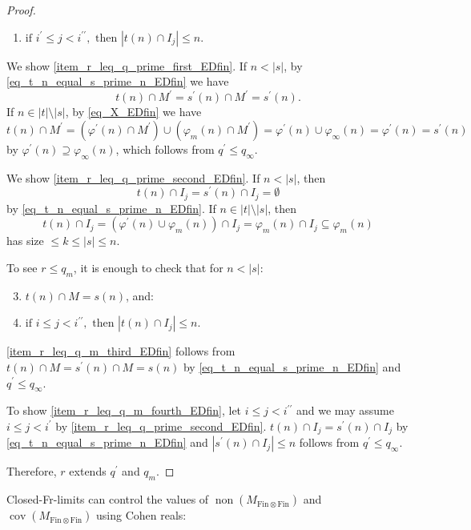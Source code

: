 \documentclass[a4paper,12pt]{amsart}
\theoremstyle{definition}
\numberwithin{thm}{section}
\numberwithin{equation}{section}
\DeclareMathOperator{\non}{non}
\DeclareMathOperator{\cov}{cov}
\newcommand{\finfin}{\mathrm{Fin}\otimes\mathrm{Fin}}
\begin{document}
\begin{proof}
\begin{enumerate}
			\item\label{item_r_leq_q_prime_second_EDfin}  $\text{if }i^\prime\leq j< i^{\prime\prime},\text{ then } |t(n)\cap I_j|\leq n$.
		\end{enumerate}
		We show \eqref{item_r_leq_q_prime_first_EDfin}.
		If $n<|s|$, by \eqref{eq_t_n_equal_s_prime_n_EDfin} we have
        \[
        t(n)\cap M^\prime=s^\prime(n)\cap M^\prime=s^\prime(n).
        \]
        If $n\in|t|\setminus|s|$, by \eqref{eq_X_EDfin} we have
        \[
        t(n)\cap M^\prime=(\varphi^\prime(n)\cap M^\prime)\cup(\varphi_m(n)\cap M^\prime)=\varphi^\prime(n)\cup\varphi_\infty(n)=\varphi^\prime(n)=s^\prime(n)
        \]
        by $\varphi^\prime(n)\supseteq\varphi_\infty(n)$, which follows from $q^\prime\leq q_\infty$.
		
		We show \eqref{item_r_leq_q_prime_second_EDfin}. 
		If $n<|s|$, then
        \[
        t(n)\cap I_j=s^\prime(n)\cap I_j=\emptyset
        \]
        by \eqref{eq_t_n_equal_s_prime_n_EDfin}.
		If $n\in|t|\setminus |s|$, then 
		\[
        t(n)\cap I_j=(\varphi^\prime(n)\cup\varphi_m(n))\cap I_j=\varphi_m(n)\cap I_j\subseteq \varphi_m(n)
        \]
        has size $\leq k\leq|s|\leq n$. 
		
		To see $r\leq q_m$, it is enough to check that for $n<|s|$:
		\begin{enumerate}
			\setcounter{enumi}{2}
			\item \label{item_r_leq_q_m_third_EDfin} $t(n)\cap M=s(n)$, and:
			\item \label{item_r_leq_q_m_fourth_EDfin} $\text{if }i\leq j< i^{\prime\prime},\text{ then } |t(n)\cap I_j|\leq n$.
		\end{enumerate}
		\eqref{item_r_leq_q_m_third_EDfin} follows from $t(n)\cap M=s^\prime(n)\cap M=s(n)$ by \eqref{eq_t_n_equal_s_prime_n_EDfin} and $q^\prime\leq q_\infty$.
		
		To show \eqref{item_r_leq_q_m_fourth_EDfin}, let $i\leq j< i^{\prime\prime}$ and we may assume $i\leq j< i^{\prime}$ by \eqref{item_r_leq_q_prime_second_EDfin}.
		$t(n)\cap I_j=s^\prime(n)\cap I_j$ by \eqref{eq_t_n_equal_s_prime_n_EDfin} and $|s^\prime(n)\cap I_j|\leq n$ follows from $q^\prime\leq q_\infty$.
		
		Therefore, $r$ extends $q^\prime$ and $q_m$.
	\end{proof}

    Closed-Fr-limits can control the values of $\non(M_{\finfin})$ and $\cov(M_{\finfin})$ using Cohen reals:
\end{document}
